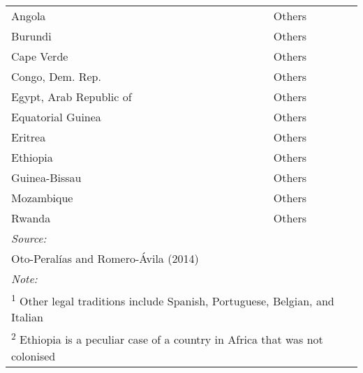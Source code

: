 \documentclass[a4paper,nobind]{templates/ociamthesis}
\newcommand*{\bibtitle}{References}
\begin{document}
\begin{table}
\begin{tabular}[t]{ll}
Angola & Others\\
Burundi & Others\\
Cape Verde & Others\\
\addlinespace
Congo, Dem. Rep. & Others\\
Egypt, Arab Republic of & Others\\
Equatorial Guinea & Others\\
Eritrea & Others\\
Ethiopia & Others\\
\addlinespace
Guinea-Bissau & Others\\
Mozambique & Others\\
Rwanda & Others\\
\bottomrule
\multicolumn{2}{l}{\rule{0pt}{1em}\textit{Source: }}\\
\multicolumn{2}{l}{\rule{0pt}{1em}Oto-Peralías and Romero-Ávila (2014)}\\
\multicolumn{2}{l}{\rule{0pt}{1em}\textit{Note: }}\\
\multicolumn{2}{l}{\rule{0pt}{1em}\textsuperscript{1} Other legal traditions include Spanish, Portuguese, Belgian, and Italian}\\
\multicolumn{2}{l}{\rule{0pt}{1em}\textsuperscript{2} Ethiopia is a peculiar case of a country in Africa that was not colonised}\\
\end{tabular}
\end{table}




\setlength{\baselineskip}{0pt} %

{\renewcommand*\MakeUppercase[1]{#1}%
\printbibliography[heading=bibintoc,title={\bibtitle}]}
\end{document}
